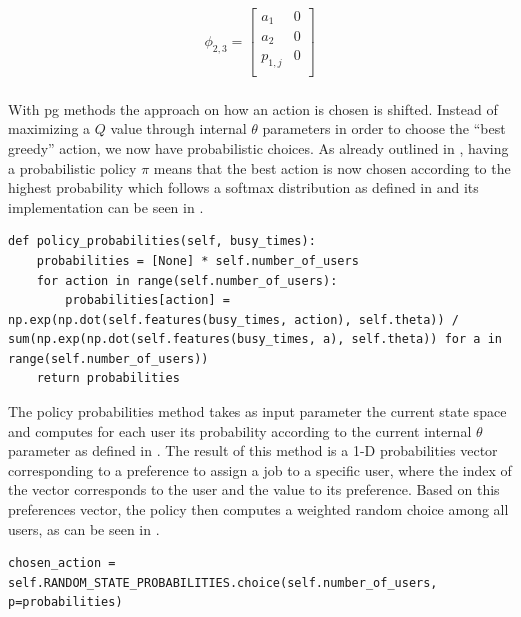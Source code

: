 \begin{equation}
\label{eq:kbatch_features_ex}
	\phi_{2,3} = 
	\begin{bmatrix}
	a_1 & 0 \\
	a_2 & 0 \\
	p_{1,j} & 0 \\
	\end{bmatrix}
\end{equation}

\subsubsection{}

With \gls{pg} methods the approach on how an action is chosen is shifted. Instead of maximizing a $Q$ value through internal $\theta$ parameters in order to choose the ``best greedy'' action, we now have probabilistic choices. As already outlined in , having a probabilistic policy $\pi$ means that the best action is now chosen according to the highest probability which follows a softmax distribution as defined in  and its implementation can be seen in .

\begin{lstlisting}[caption=Softmax distribution of preferences probabilities,label=lst:softmax_probabilities,style=CustomPython]
def policy_probabilities(self, busy_times):
    probabilities = [None] * self.number_of_users
    for action in range(self.number_of_users):
        probabilities[action] = np.exp(np.dot(self.features(busy_times, action), self.theta)) / sum(np.exp(np.dot(self.features(busy_times, a), self.theta)) for a in range(self.number_of_users))
    return probabilities
\end{lstlisting}

The policy probabilities method takes as input parameter the current state space and computes for each user its probability according to the current internal $\theta$ parameter as defined in . The result of this method is a 1-D probabilities vector corresponding to a preference to assign a job to a specific user, where the index of the vector corresponds to the user and the value to its preference. Based on this preferences vector, the policy then computes a weighted random choice among all users, as can be seen in .

\begin{lstlisting}[caption=Probabilistic user choice,label=lst:prob_user_choice,style=CustomPython]
chosen_action = self.RANDOM_STATE_PROBABILITIES.choice(self.number_of_users, p=probabilities)
\end{lstlisting}

